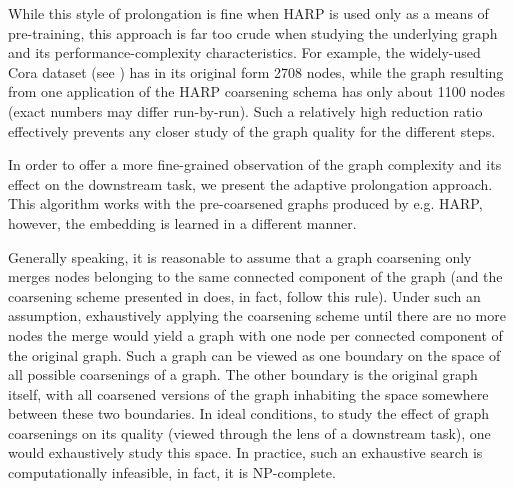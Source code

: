 While this style of prolongation is fine when HARP is used only as a means of pre-training, this approach is far too crude when studying the underlying graph and its performance-complexity characteristics. For example, the widely-used Cora dataset (see \cite{yang_revisiting_2016}) has in its original form 2708 nodes, while the graph resulting from one application of the HARP coarsening schema has only about 1100 nodes (exact numbers may differ run-by-run). Such a relatively high reduction ratio effectively prevents any closer study of the graph quality for the different steps.

In order to offer a more fine-grained observation of the graph complexity and its effect on the downstream task, we present the adaptive prolongation approach. This algorithm works with the pre-coarsened graphs produced by e.g. HARP, however, the embedding is learned in a different manner.

Generally speaking, it is reasonable to assume that a graph coarsening only merges nodes belonging to the same connected component of the graph (and the coarsening scheme presented in \cite{chen_harp_2018} does, in fact, follow this rule). Under such an assumption, exhaustively applying the coarsening scheme until there are no more nodes the merge would yield a graph with one node per connected component of the original graph. Such a graph can be viewed as one boundary on the space of all possible coarsenings of a graph. The other boundary is the original graph itself, with all coarsened versions of the graph inhabiting the space somewhere between these two boundaries. In ideal conditions, to study the effect of graph coarsenings on its quality (viewed through the lens of a downstream task), one would exhaustively study this space. In practice, such an exhaustive search is computationally infeasible, in fact, it is NP-complete.


